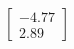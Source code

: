 \documentclass[preview]{standalone}
\begin{document}
\begin{align*}
\begin{bmatrix} -4.77 \\ 2.89 \end{bmatrix}
\end{align*}
\end{document}
